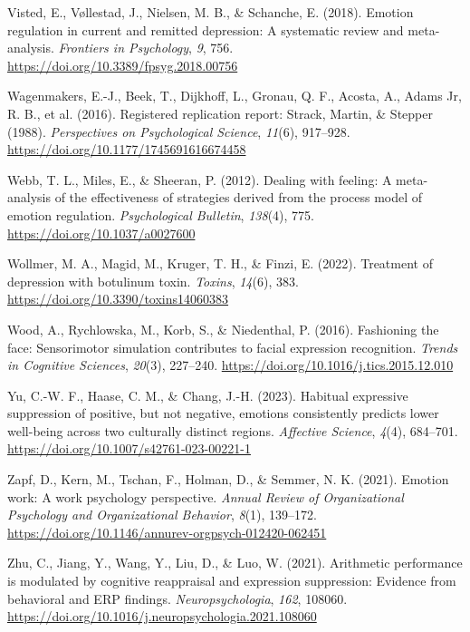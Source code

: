 \documentclass[
  letterpaper,
  DIV=11,
  numbers=noendperiod]{scrartcl}
\newlength{\cslhangindent}
\newenvironment{CSLReferences}[2] %
 {\begin{list}{}{%
  \setlength{\itemindent}{0pt}
  \setlength{\leftmargin}{0pt}
  \setlength{\parsep}{0pt}
  \ifodd #1
   \setlength{\leftmargin}{\cslhangindent}
   \setlength{\itemindent}{-1\cslhangindent}
  \fi
  \setlength{\itemsep}{#2\baselineskip}}}
 {\end{list}}
\begin{document}
\begin{CSLReferences}{1}{0}
Visted, E., Vøllestad, J., Nielsen, M. B., \& Schanche, E. (2018).
Emotion regulation in current and remitted depression: A systematic
review and meta-analysis. \emph{Frontiers in Psychology}, \emph{9}, 756.
\url{https://doi.org/10.3389/fpsyg.2018.00756}

{Wagenmakers, E.-J., Beek, T., Dijkhoff, L., Gronau, Q. F., Acosta, A.,
Adams Jr, R. B., et al.} (2016). Registered replication report: {Strack,
Martin, \& Stepper (1988)}. \emph{Perspectives on Psychological
Science}, \emph{11}(6), 917--928.
\url{https://doi.org/10.1177/1745691616674458}

Webb, T. L., Miles, E., \& Sheeran, P. (2012). Dealing with feeling: A
meta-analysis of the effectiveness of strategies derived from the
process model of emotion regulation. \emph{Psychological Bulletin},
\emph{138}(4), 775. \url{https://doi.org/10.1037/a0027600}

Wollmer, M. A., Magid, M., Kruger, T. H., \& Finzi, E. (2022). Treatment
of depression with botulinum toxin. \emph{Toxins}, \emph{14}(6), 383.
\url{https://doi.org/10.3390/toxins14060383}

Wood, A., Rychlowska, M., Korb, S., \& Niedenthal, P. (2016). Fashioning
the face: Sensorimotor simulation contributes to facial expression
recognition. \emph{Trends in Cognitive Sciences}, \emph{20}(3),
227--240. \url{https://doi.org/10.1016/j.tics.2015.12.010}

Yu, C.-W. F., Haase, C. M., \& Chang, J.-H. (2023). Habitual expressive
suppression of positive, but not negative, emotions consistently
predicts lower well-being across two culturally distinct regions.
\emph{Affective Science}, \emph{4}(4), 684--701.
\url{https://doi.org/10.1007/s42761-023-00221-1}

Zapf, D., Kern, M., Tschan, F., Holman, D., \& Semmer, N. K. (2021).
Emotion work: A work psychology perspective. \emph{Annual Review of
Organizational Psychology and Organizational Behavior}, \emph{8}(1),
139--172. \url{https://doi.org/10.1146/annurev-orgpsych-012420-062451}

Zhu, C., Jiang, Y., Wang, Y., Liu, D., \& Luo, W. (2021). Arithmetic
performance is modulated by cognitive reappraisal and expression
suppression: Evidence from behavioral and {ERP} findings.
\emph{Neuropsychologia}, \emph{162}, 108060.
\url{https://doi.org/10.1016/j.neuropsychologia.2021.108060}

\end{CSLReferences}
\end{document}
